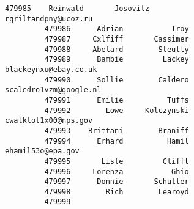 \documentclass[11pt]{article}
\begin{document}
\begin{Verbatim}[commandchars=\\\{\}]
         479985    Reinwald       Josovitz                      rgriltandpny@ucoz.ru   
         479986      Adrian           Troy                                             
         479987     Cxlfiff       Cassimer                                             
         479988     Abelard        Steutly                                             
         479989      Bambie         Lackey                     blackeynxu@ebay.co.uk   
         479990      Sollie        Caldero                    scaledro1vzm@google.nl   
         479991      Emilie          Tuffs                                             
         479992        Lowe     Kolczynski                      cwalklot1x00@nps.gov   
         479993    Brittani        Braniff                                             
         479994      Erhard          Hamil                         ehamil53o@epa.gov   
         479995       Lisle         Clifft                                             
         479996     Lorenza           Ghio                                             
         479997      Donnie       Schutter                                             
         479998        Rich        Learoyd                                             
         479999                                                                        
         

\end{Verbatim}
\end{document}
